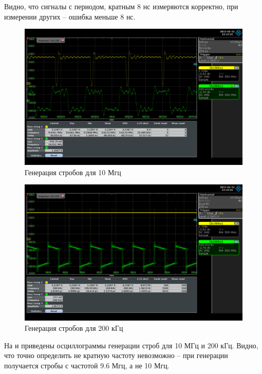 Видно, что сигналы с периодом, кратным 8 нс измеряются корректно, при измерении других -- ошибка меньше 8 нс.

\begin{figure}[ht!] 
	\center
	\includegraphics  [scale=0.3] {my_folder/images//stb_10mhz}
	\caption{Генерация стробов для 10 Мгц} 
	\label{fig:stb-10mhz}  
\end{figure}

\begin{figure}[ht!] 
	\center
	\includegraphics  [scale=0.3] {my_folder/images//stb_200khz}
	\caption{Генерация стробов для 200 кГц} 
	\label{fig:stb-200khz}  
\end{figure}

\FloatBarrier

На  и  приведены осциллограммы генерации строб для 10 МГц и 200 кГц.
Видно, что точно определить не кратную частоту невозможно -- при генерации получается стробы с частотой 9.6 Мгц, а не 10 Мгц.

